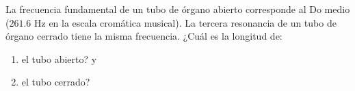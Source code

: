 \item La frecuencia fundamental de un tubo de órgano abierto corresponde al Do medio ($261.6\text{ Hz}$ en la escala cromática musical). La tercera resonancia de un tubo de órgano cerrado tiene la misma frecuencia. ¿Cuál es la longitud de:
\begin{enumerate}
    \item el tubo abierto? y
    \item el tubo cerrado?
\end{enumerate}